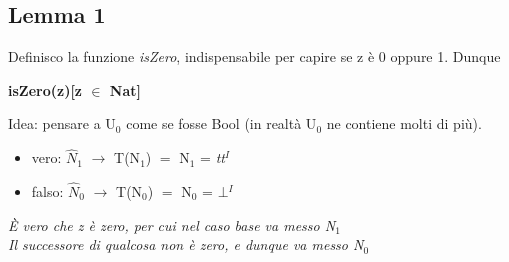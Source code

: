 \subsection{Lemma 1}
Definisco la funzione \textit{isZero}, indispensabile per capire se z \`e 0 oppure 1. Dunque\\
\begin{center}\textbf{isZero(z)[z $\in$ Nat]}\end{center}
Idea: pensare a U$_0$ come se fosse Bool (in realt\`a U$_0$ ne contiene molti di pi\`u).
\begin{itemize}
\item vero: $\hat{N}_1$ $\rightarrow$ T(N$_1$) $=$ N$_1$ = \textit{tt}$^I$
\item falso: $\hat{N}_0$ $\rightarrow$ T(N$_0$) $=$ N$_0$ = \textit{$\bot$}$^I$
\end{itemize}
\noindent
\textit{\`E vero che z \`e zero, per cui nel caso base va messo N$_1$\\
Il successore di qualcosa non \`e zero, e dunque va messo N$_0$}
\scriptsize
\begin{adjustwidth}{-7em}{}
\begin{prooftree}




\end{prooftree}
\end{adjustwidth}
\noindent
\normalsize

